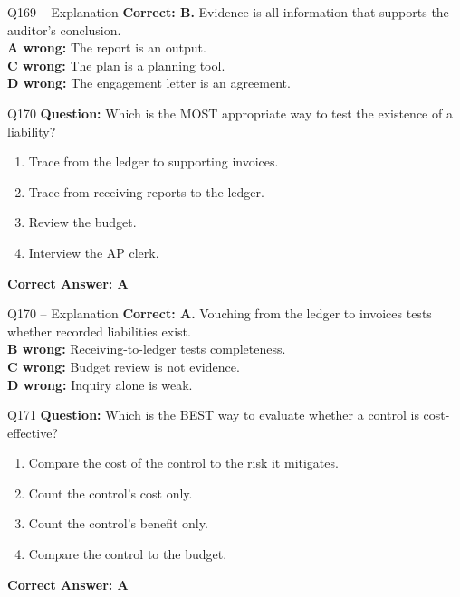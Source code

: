 \documentclass[aspectratio=169,10pt]{beamer}
\begin{document}
	\begin{frame}[t]{Q169 -- Explanation}
		\small
		\textbf{Correct: B.} Evidence is all information that supports the auditor's conclusion. \\[4pt]
		\textbf{A wrong:} The report is an output. \\[2pt]
		\textbf{C wrong:} The plan is a planning tool. \\[2pt]
		\textbf{D wrong:} The engagement letter is an agreement.
	\end{frame}
	
	\begin{frame}[t]{Q170}
		\small
		\textbf{Question:} Which is the MOST appropriate way to test the existence of a liability?
		\begin{enumerate}[label=\Alph*.,itemsep=1pt,topsep=2pt]
			\item Trace from the ledger to supporting invoices.
			\item Trace from receiving reports to the ledger.
			\item Review the budget.
			\item Interview the AP clerk.
		\end{enumerate}
		\vspace{4pt}
		\textbf{Correct Answer: A}
	\end{frame}
	
	\begin{frame}[t]{Q170 -- Explanation}
		\small
		\textbf{Correct: A.} Vouching from the ledger to invoices tests whether recorded liabilities exist. \\[4pt]
		\textbf{B wrong:} Receiving-to-ledger tests completeness. \\[2pt]
		\textbf{C wrong:} Budget review is not evidence. \\[2pt]
		\textbf{D wrong:} Inquiry alone is weak.
	\end{frame}
	
	\begin{frame}[t]{Q171}
		\small
		\textbf{Question:} Which is the BEST way to evaluate whether a control is cost-effective?
		\begin{enumerate}[label=\Alph*.,itemsep=1pt,topsep=2pt]
			\item Compare the cost of the control to the risk it mitigates.
			\item Count the control's cost only.
			\item Count the control's benefit only.
			\item Compare the control to the budget.
		\end{enumerate}
		\vspace{4pt}
		\textbf{Correct Answer: A}
	\end{frame}
	
\end{document}
